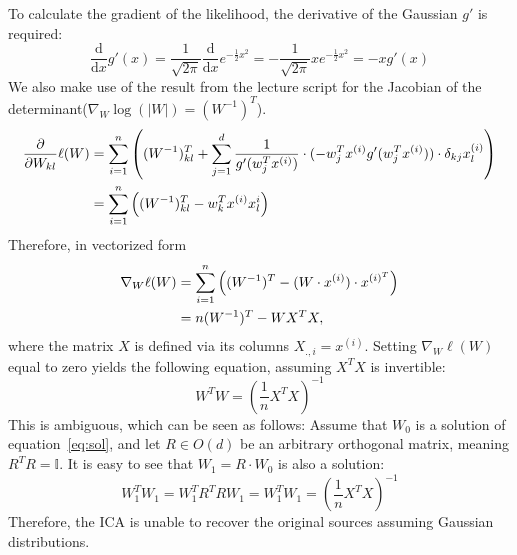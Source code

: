 \begin{answer}
To calculate the gradient of the likelihood, the derivative of the Gaussian $g'$ is required:
\begin{equation}
    \frac{\mathrm{d}}{\mathrm{d}x}g'(x) = \frac{1}{\sqrt{2\pi}} \frac{\mathrm{d}}{\mathrm{d}x} e^{-\frac{1}{2}x^2} 
    = - \frac{1}{\sqrt{2\pi}} x e^{-\frac{1}{2}x^2} = -x g'(x)
\end{equation}
We also make use of the result from the lecture script for the Jacobian of the determinant($\nabla_W\log(|W|) = (W^{-1})^T$).
\begin{align*}
    \frac{\partial}{\partial W_{kl}} \ell(W) 
    &= \sum_{i=1}^{n}\left((W^{-1})^T_{kl} + \sum_{j=1}^{d} \frac{1}{g'(w_j^Tx^{(i)})}\cdot (-w_j^Tx^{(i)} g'(w_j^Tx^{(i)})) \cdot\delta_{kj} x_l^{(i)}\right) \\
    &= \sum_{i=1}^{n}\left((W^{-1})^T_{kl} - w_k^Tx^{(i)} x_l^{i}\right)
\end{align*}
Therefore, in vectorized form
\begin{align*}
    \nabla_W \ell(W) &= \sum_{i=1}^{n}\left((W^{-1})^T - (W\cdot x^{(i)}) \cdot x^{(i)^T}\right) \\
    &= n (W^{-1})^T - WX^TX,    
\end{align*}
where the matrix $X$ is defined via its columns $X_{.,i} = x^{(i)}$.
Setting $\nabla_W \ell(W)$ equal to zero yields the following equation, assuming $X^TX$ is invertible:
\begin{equation}
    \label{eq:sol}
    W^T W = (\frac{1}{n}X^TX)^{-1}
\end{equation}
This is ambiguous, which can be seen as follows:
Assume that $W_0$ is a solution of equation~\ref{eq:sol}, and let $R\in O(d)$ be an arbitrary orthogonal matrix, meaning $R^TR = \mathbb{I}$.
It is easy to see that $W_1 = R\cdot W_0$ is also a solution:
\begin{equation*}
    W_1^T W_1 = W_1^T R^T R W_1 = W_1^T W_1 = (\frac{1}{n}X^TX)^{-1}
\end{equation*}
Therefore, the ICA is unable to recover the original sources assuming Gaussian distributions.
\end{answer}
